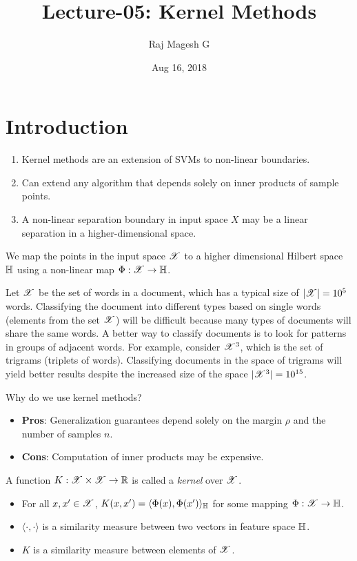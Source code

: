 \documentclass[a4paper,english,12pt]{article}
\title{Lecture-05: Kernel Methods}
\date{Aug 16, 2018}
\author{Raj Magesh G}
\begin{document}
\maketitle
\section{Introduction}

\begin{enumerate}
\item Kernel methods are an extension of SVMs to non-linear boundaries.
\item Can extend any algorithm that depends solely on inner products of sample points.
\item A non-linear separation boundary in input space $X$ may be a linear separation in a higher-dimensional space.
\end{enumerate}
We map the points in the input space $\mathscr{X}$ to a higher dimensional Hilbert space $\mathbb{H}$ using a non-linear map $\Phi : \mathscr{X} \to \mathbb{H}$. 


\begin{exmp} 
Let $\mathscr{X}$ be the set of words in a document, which has a typical size of $|\mathscr{X}| = 10^5$ words. 
Classifying the document into different types based on single words (elements from the set $\mathscr{X}$) will be difficult because many types of documents will share the same words. 
A better way to classify documents is to look for patterns in groups of adjacent words. 
For example, consider $\mathscr{X}^3$, which is the set of trigrams (triplets of words). Classifying documents in the space of trigrams will yield better results despite the increased size of the space $|\mathscr{X}^3| = 10^{15}$.
\end{exmp}

\begin{rem}
Why do we use kernel methods?
\begin{itemize}
	\item \textbf{Pros}: Generalization guarantees depend solely on the margin $\rho$ and the number of samples $n$.
	\item \textbf{Cons}: Computation of inner products may be expensive.
\end{itemize}
\end{rem}

\begin{defn}
	A function $K : \mathscr{X} \times \mathscr{X} \to \mathbb{R}$ is called a \textit{kernel} over $\mathscr{X}$.
\begin{itemize}
	\item For all $x, x' \in \mathscr{X}$, $K(x, x') = \langle \Phi(x), \Phi(x') \rangle_{\mathbb{H}}$ for some mapping $\Phi : \mathscr{X} \to \mathbb{H}$.
	\item $\langle \cdot, \cdot \rangle$ is a similarity measure between two vectors in feature space $\mathbb{H}$.
	\item $K$ is a similarity measure between elements of $\mathscr{X}$.	
\end{itemize}
\end{defn}
\end{document}
